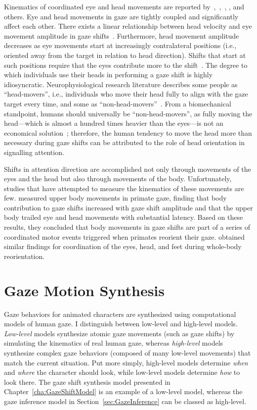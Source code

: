 Kinematics of coordinated eye and head movements are reported by~\citet{guitton1987gaze},~\citet{freedman2000coordination},~\citet{barnes1979vor}, \citet{uemura1980eyehead}, and others. Eye and head movements in gaze are tightly coupled and significantly affect each other. There exists a linear relationship between head velocity and eye movement amplitude in gaze shifts~\citep{barnes1979vor,uemura1980eyehead}. Furthermore, head movement amplitude decreases as eye movements start at increasingly contralateral positions (i.e., oriented away from the target in relation to head direction). Shifts that start at such positions require that the eyes contribute more to the shift~\citep{mccluskey2007monkeys}. The degree to which individuals use their heads in performing a gaze shift is highly idiosyncratic. Neurophysiological research literature describes some people as ``head-movers'', i.e., individuals who move their head fully to align with the gaze target every time, and some as ``non-head-movers''~\citep{fuller1992head}. From a biomechanical standpoint, humans should universally be ``non-head-movers'', as fully moving the head---which is almost a hundred times heavier than the eyes---is not an economical solution~\citep{kim2007head}; therefore, the human tendency to move the head more than necessary during gaze shifts can be attributed to the role of head orientation in signalling attention.

Shifts in attention direction are accomplished not only through movements of the eyes and the head but also through movements of the body. Unfortunately, studies that have attempted to measure the kinematics of these movements are few. \citet{mccluskey2007monkeys} measured upper body movements in primate gaze, finding that body contribution to gaze shifts increased with gaze shift amplitude and that the upper body trailed eye and head movements with substantial latency. Based on these results, they concluded that body movements in gaze shifts are part of a series of coordinated motor events triggered when primates reorient their gaze. \citet{hollands2004wholebody} obtained similar findings for coordination of the eyes, head, and feet during whole-body reorientation.

\section{Gaze Motion Synthesis}

Gaze behaviors for animated characters are synthesized using computational models of human gaze. I distinguish between low-level and high-level models. \emph{Low-level} models synthesize atomic gaze movements (such as gaze shifts) by simulating the kinematics of real human gaze, whereas \emph{high-level} models synthesize complex gaze behaviors (composed of many low-level movements) that match the current situation. Put more simply, high-level models determine \emph{when} and \emph{where} the character should look, while low-level models determine \emph{how} to look there. The gaze shift synthesis model presented in Chapter~\ref{cha:GazeShiftModel} is an example of a low-level model, whereas the gaze inference model in Section~\ref{sec:GazeInference} can be classed as high-level.

